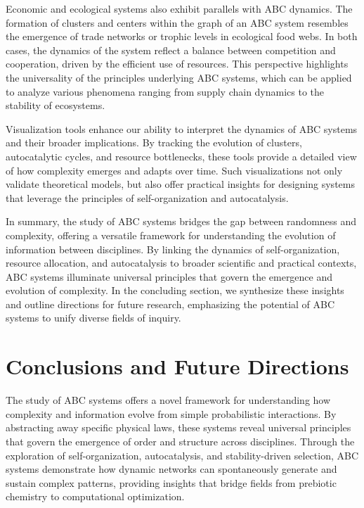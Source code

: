\documentclass[%
 preprint, linenumbers,
 amsmath,amssymb,
 aps, physrev,
]{revtex4-2}
\begin{document}
Economic and ecological systems also exhibit parallels with ABC dynamics. The formation of clusters and centers within the graph of an ABC system resembles the emergence of trade networks or trophic levels in ecological food webs. In both cases, the dynamics of the system reflect a balance between competition and cooperation, driven by the efficient use of resources. This perspective highlights the universality of the principles underlying ABC systems, which can be applied to analyze various phenomena ranging from supply chain dynamics to the stability of ecosystems.

Visualization tools enhance our ability to interpret the dynamics of ABC systems and their broader implications. By tracking the evolution of clusters, autocatalytic cycles, and resource bottlenecks, these tools provide a detailed view of how complexity emerges and adapts over time. Such visualizations not only validate theoretical models, but also offer practical insights for designing systems that leverage the principles of self-organization and autocatalysis.

In summary, the study of ABC systems bridges the gap between randomness and complexity, offering a versatile framework for understanding the evolution of information between disciplines. By linking the dynamics of self-organization, resource allocation, and autocatalysis to broader scientific and practical contexts, ABC systems illuminate universal principles that govern the emergence and evolution of complexity. In the concluding section, we synthesize these insights and outline directions for future research, emphasizing the potential of ABC systems to unify diverse fields of inquiry.

\section{Conclusions and Future Directions}

The study of ABC systems offers a novel framework for understanding how complexity and information evolve from simple probabilistic interactions. By abstracting away specific physical laws, these systems reveal universal principles that govern the emergence of order and structure across disciplines. Through the exploration of self-organization, autocatalysis, and stability-driven selection, ABC systems demonstrate how dynamic networks can spontaneously generate and sustain complex patterns, providing insights that bridge fields from prebiotic chemistry to computational optimization.
\end{document}
